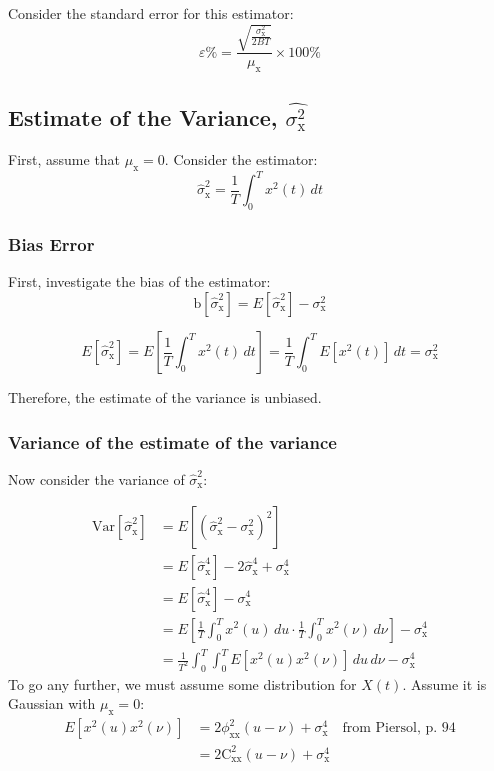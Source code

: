 \documentclass[12pt]{book}
\theoremstyle{definition}
\begin{document}
Consider the standard error for this estimator:
\[
\varepsilon \% = \frac{\sqrt{\frac{\sigma^2_\mathrm{x}}{2 B T}}}{\mu_\mathrm{x}} \times 100\%
\]

\subsection{Estimate of the Variance, \(\hat{\sigma^2_\mathrm{x}}\)}


First, assume that \(\mu_\mathrm{x} = 0.\) Consider the estimator:
\[
\hat{\sigma}^2_\mathrm{x} = \frac{1}{T}\int_0^T x^2(t) \, dt
\]

\subsubsection*{Bias Error}
First, investigate the bias of the estimator:
\[
\mathrm{b}[\hat{\sigma}^2_\mathrm{x}] = E[\hat{\sigma}^2_\mathrm{x}] - \sigma^2_\mathrm{x}
\]

\[
E[\hat{\sigma}^2_\mathrm{x}] = E \left [  \frac{1}{T} \int_0^T x^2(t) \, dt \right ] = \frac{1}{T} \int_0^T E [x^2(t)] \, dt = \sigma^2_\mathrm{x}
\]

Therefore, the estimate of the variance is unbiased.\\

\subsubsection{Variance of the estimate of the variance}
Now consider the variance of \(\hat{\sigma}^2_\mathrm{x}\):

\[
\begin{aligned}
    \mathrm{Var}[\hat{\sigma}^2_\mathrm{x}] & = E [ (\hat{\sigma}^2_\mathrm{x} - {\sigma}^2_\mathrm{x})^2] \\
    & = E [\hat{\sigma}^4_\mathrm{x}] - 2\hat{\sigma}^4_\mathrm{x} + {\sigma}^4_\mathrm{x} \\
    & = E [\hat{\sigma}^4_\mathrm{x}] - {\sigma}^4_\mathrm{x} \\
    & = E \left [  \frac{1}{T} \int_0^T x^2(u) \, du \cdot \frac{1}{T} \int_0^T x^2(\nu) \, d \nu\right ] -{\sigma}^4_\mathrm{x} \\
    & = \frac{1}{T^2} \int_0^T \int_0^T E[x^2(u) x^2(\nu) ] \, du \,d \nu - {\sigma}^4_\mathrm{x} 
\end{aligned}
\]
To go any further, we must assume some distribution for \(X(t)\). Assume it is Gaussian with \(\mu_\mathrm{x} = 0\):
\[
\begin{aligned}
    E[x^2(u) x^2(\nu)] & = 2 \phi^2_\mathrm{xx}(u-\nu) + \sigma^4_\mathrm{x} \quad \text{from Piersol, p. 94}\\
    & = 2 \mathrm{C}^2_\mathrm{xx}(u-\nu) + \sigma^4_\mathrm{x} 
\end{aligned}
\]
\end{document}
